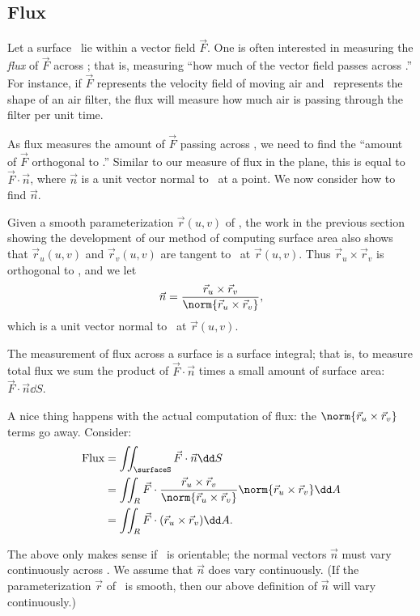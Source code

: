 \subsection{Flux}

Let a surface \surfaceS\ lie within a vector field $\vec F$. One is often interested in measuring the \emph{flux} of $\vec F$ across \surfaceS; that is, measuring ``how much of the vector field passes across \surfaceS.'' For instance, if $\vec F$ represents the velocity field of moving air and \surfaceS\ represents the shape of an air filter, the flux will measure how much air is passing through the filter per unit time.

As flux measures the amount of $\vec F$ passing across \surfaceS, we need to find the ``amount of $\vec F$ orthogonal to \surfaceS.'' Similar to our measure of flux in the plane, this is equal to $\vec F\cdot \vec n$, where $\vec n$ is a unit vector normal to \surfaceS\ at a point. We now consider how to find $\vec n$.

Given a smooth parameterization $\vec r(u,v)$ of \surfaceS, the work in the previous section showing the development of our method of computing surface area also shows that $\vec r_u(u,v)$ and $\vec r_v(u,v)$ are tangent to \surfaceS\ at $\vec r(u,v)$. Thus $\vec r_u\times \vec r_v$ is orthogonal to \surfaceS, and we let
\[\vec n = \frac{\vec r_u\times \vec r_v}{\norm{\vec r_u\times \vec r_v}},\]
which is a unit vector normal to \surfaceS\ at $\vec r(u,v)$.

The measurement of flux across a surface is a surface integral; that is, to measure total flux we sum the product of $\vec F\cdot\vec n$ times a small amount of surface area: $\vec F\cdot \vec n\dd S$. 

A nice thing happens with the actual computation of flux: the $\norm{\vec r_u\times \vec r_v}$ terms go away. Consider:
\begin{align*}
	\text{Flux}
	&= \iint_{\surfaceS} \vec F\cdot \vec n\dd S \\
	&= \iint_R \vec F\cdot \frac{\vec r_u\times \vec r_v}{\norm{\vec r_u\times \vec r_v}}\norm{\vec r_u\times \vec r_v}\dd A \\
	&= \iint_R \vec F\cdot (\vec r_u\times \vec r_v)\dd A.
\end{align*}

The above only makes sense if \surfaceS\ is orientable; the normal vectors $\vec n$ must vary continuously across \surfaceS. We assume that $\vec n$ does vary continuously. (If the parameterization $\vec r$ of \surfaceS\ is smooth, then our above definition of $\vec n$ will vary continuously.)

